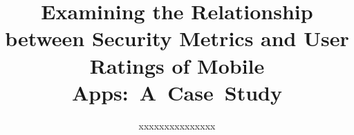 \documentclass{sig-alternate-05-2015}
\newif\ifisnopii
\begin{document}
\title{Examining the Relationship between Security Metrics and User Ratings of Mobile Apps:~A~Case~Study}


\ifisnopii %
\author{
%
\alignauthor
Daniel E. Krutz, Nuthan Munaiah, Casey Klimkowsky, Shannon Trudeau, Adam Blaine, Andrew Meneely, and Sam Malachowsky\\ 	
       \affaddr{Rochester Institute of Technology, Rochester, NY, USA}\\
       \email{\{dxkvse, nm6061, cek3403, smt9020, amb8805, axmvse, samvse\}@rit.edu}
       \alignauthor
} %

\else %
\author{
%
\alignauthor
xxxxxxxxxxxxxxx\\ 	
	\\
       \\
       \\
        \\
       \alignauthor
} %
\fi %


\maketitle
\end{document}
